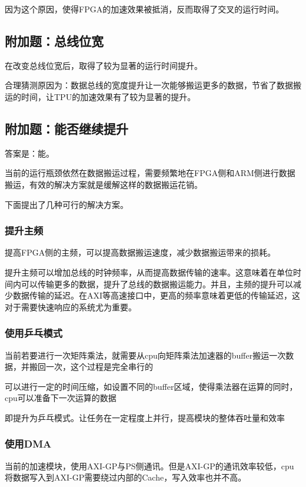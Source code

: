 \documentclass[12pt,a4paper]{article}
\begin{document}
因为这个原因，使得FPGA的加速效果被抵消，反而取得了交叉的运行时间。

\subsection{附加题：总线位宽}

在改变总线位宽后，取得了较为显著的运行时间提升。

合理猜测原因为：数据总线的宽度提升让一次能够搬运更多的数据，节省了数据搬运的时间，让TPU的加速效果有了较为显著的提升。

\subsection{附加题：能否继续提升}

答案是：能。

当前的运行瓶颈依然在数据搬运过程，需要频繁地在FPGA侧和ARM侧进行数据搬运，有效的解决方案就是缓解这样的数据搬运花销。

下面提出了几种可行的解决方案。

\subsubsection{提升主频}

提高FPGA侧的主频，可以提高数据搬运速度，减少数据搬运带来的损耗。

提升主频可以增加总线的时钟频率，从而提高数据传输的速率。这意味着在单位时间内可以传输更多的数据，提升了总线的数据搬运能力。并且，主频的提升可以减少数据传输的延迟。在AXI等高速接口中，更高的频率意味着更低的传输延迟，这对于需要快速响应的系统尤为重要。

\subsubsection{使用乒乓模式}
当前若要进行一次矩阵乘法，就需要从cpu向矩阵乘法加速器的buffer搬运一次数据，并搬回一次，这个过程是完全串行的

可以进行一定的时间压缩，如设置不同的buffer区域，使得乘法器在运算的同时，cpu可以准备下一次运算的数据

即提升为乒乓模式。让任务在一定程度上并行，提高模块的整体吞吐量和效率

\subsubsection{使用DMA}

当前的加速模块，使用AXI-GP与PS侧通讯。但是AXI-GP的通讯效率较低，cpu将数据写入到AXI-GP需要绕过内部的Cache，写入效率也并不高。
\end{document}
